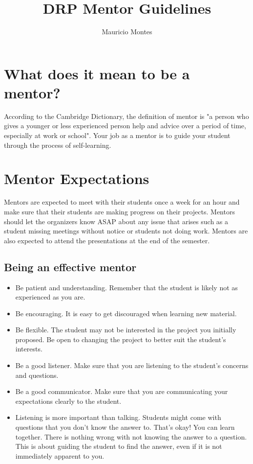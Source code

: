 \documentclass{article}
\begin{document}
\author{Mauricio Montes}
\title{DRP Mentor Guidelines}

\maketitle

\section{What does it mean to be a mentor?}

According to the Cambridge Dictionary, the definition of mentor is "a person who gives a younger or
less experienced person help and advice over a period of time, especially at work or school". Your
job as a mentor is to guide your student through the process of self-learning. 



\section{Mentor Expectations}

Mentors are expected to meet with their students once a week for an hour and make sure that their
students are making progress on their projects. Mentors should let the organizers know ASAP about
any issue that arises such as a student missing meetings without notice or students not doing work.
Mentors are also expected to attend the presentations at the end of the semester.

\subsection{Being an effective mentor}

\begin{itemize}


\item Be patient and understanding. Remember that the student is likely not as experienced as
you are.

\item Be encouraging. It is easy to get discouraged when learning new material. 

\item Be flexible. The student may not be interested in the project you initially
proposed. Be open to changing the project to better suit the student's
interests.

\item Be a good listener. Make sure that you are listening to the student's
concerns and questions.

\item Be a good communicator. Make sure that you are communicating
your expectations clearly to the student.

\item Listening is more important than talking. Students might come with questions that you don't 
know the answer to. That's okay! You can learn together. There is nothing wrong with not
knowing the answer to a question. This is about guiding the student to find the answer, even
if it is not immediately apparent to you. 

\end{itemize}
 
\end{document}
